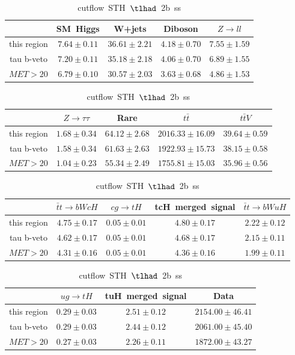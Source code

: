 \begin{table}
\footnotesize
\caption{cutflow~STH~$\tlhad$~2b~ss}
\centering
\begin{tabular}{|c|c|c|c|c|} \hline
 & SM~Higgs & W+jets & Diboson & $Z\to ll$\\\hline
this region & $7.64\pm0.11$ & $36.61\pm2.21$ & $4.18\pm0.70$ & $7.55\pm1.59$\\\hline
tau b-veto & $7.20\pm0.11$ & $35.18\pm2.18$ & $4.06\pm0.70$ & $6.89\pm1.55$\\\hline
$MET>20$ & $6.79\pm0.10$ & $30.57\pm2.03$ & $3.63\pm0.68$ & $4.86\pm1.53$\\\hline
\end{tabular}
\begin{tabular}{|c|c|c|c|c|} \hline
 & $Z\to \tau\tau$ & Rare & $t\bar{t}$ & $t\bar{t}V$\\\hline
this region & $1.68\pm0.34$ & $64.12\pm2.68$ & $2016.33\pm16.09$ & $39.64\pm0.59$\\\hline
tau b-veto & $1.58\pm0.34$ & $61.63\pm2.63$ & $1922.93\pm15.73$ & $38.15\pm0.58$\\\hline
$MET>20$ & $1.04\pm0.23$ & $55.34\pm2.49$ & $1755.81\pm15.03$ & $35.96\pm0.56$\\\hline
\end{tabular}
\begin{tabular}{|c|c|c|c|c|} \hline
 & $\bar{t}t\to bWcH$ & $cg\to tH$ & tcH~merged~signal & $\bar{t}t\to bWuH$\\\hline
this region & $4.75\pm0.17$ & $0.05\pm0.01$ & $4.80\pm0.17$ & $2.22\pm0.12$\\\hline
tau b-veto & $4.62\pm0.17$ & $0.05\pm0.01$ & $4.68\pm0.17$ & $2.15\pm0.11$\\\hline
$MET>20$ & $4.31\pm0.16$ & $0.05\pm0.01$ & $4.36\pm0.16$ & $1.99\pm0.11$\\\hline
\end{tabular}
\begin{tabular}{|c|c|c|c|} \hline
 & $ug\to tH$ & tuH~merged~signal & Data\\\hline
this region & $0.29\pm0.03$ & $2.51\pm0.12$ & $2154.00\pm46.41$\\\hline
tau b-veto & $0.29\pm0.03$ & $2.44\pm0.12$ & $2061.00\pm45.40$\\\hline
$MET>20$ & $0.27\pm0.03$ & $2.26\pm0.11$ & $1872.00\pm43.27$\\\hline
\end{tabular}
\label{tab:cutflow_reg1l1tau2b2j_ss}
\end{table}
